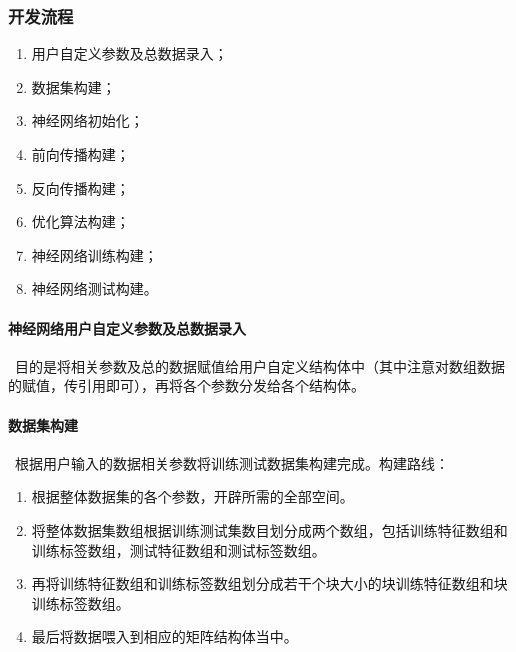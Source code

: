 \newpage
\subsubsection{开发流程}
\begin{enumerate}
  \item 用户自定义参数及总数据录入；
  \item 数据集构建；
  \item 神经网络初始化；
  \item 前向传播构建；
  \item 反向传播构建；
  \item 优化算法构建；
  \item 神经网络训练构建；
  \item 神经网络测试构建。
\end{enumerate}


\paragraph{神经网络用户自定义参数及总数据录入}~目的是将相关参数及总的数据赋值给用户自定义结构体中（其中注意对数组数据的赋值，传引用即可），再将各个参数分发给各个结构体。


\paragraph{数据集构建} ~根据用户输入的数据相关参数将训练测试数据集构建完成。构建路线：
\begin{enumerate}
  \item 根据整体数据集的各个参数，开辟所需的全部空间。
  \item 将整体数据集数组根据训练测试集数目划分成两个数组，包括训练特征数组和训练标签数组，测试特征数组和测试标签数组。
  \item 再将训练特征数组和训练标签数组划分成若干个块大小的块训练特征数组和块训练标签数组。
  \item 最后将数据喂入到相应的矩阵结构体当中。
\end{enumerate}


